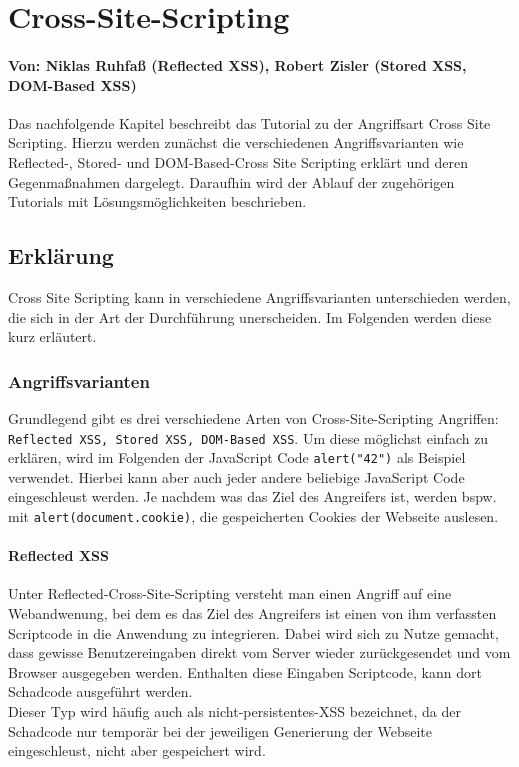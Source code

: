 \chapter{Cross-Site-Scripting}
\label{XSS}
\subsubsection*{Von: Niklas Ruhfaß (Reflected XSS), Robert Zisler (Stored XSS, DOM-Based XSS)}
Das nachfolgende Kapitel beschreibt das Tutorial zu der Angriffsart Cross Site Scripting. Hierzu werden zunächst die verschiedenen Angriffsvarianten wie Reflected-, Stored- und DOM-Based-Cross Site Scripting erklärt und deren Gegenmaßnahmen dargelegt. Daraufhin wird der Ablauf der zugehörigen Tutorials mit Lösungsmöglichkeiten beschrieben. 
\section{Erklärung}
Cross Site Scripting kann in verschiedene Angriffsvarianten unterschieden werden, die sich in der Art der Durchführung unerscheiden. Im Folgenden werden diese kurz erläutert. \\ 

\subsection{Angriffsvarianten}
Grundlegend gibt es drei verschiedene Arten von Cross-Site-Scripting Angriffen: \colorbox{altgray}{\lstinline|Reflected XSS, Stored XSS, DOM-Based XSS|}. Um diese möglichst einfach zu erklären, wird im Folgenden der JavaScript Code \colorbox{altgray}{\lstinline|alert("42")|} als Beispiel verwendet. Hierbei kann aber auch jeder andere beliebige JavaScript Code eingeschleust werden. Je nachdem was das Ziel des Angreifers ist, werden bspw. mit \colorbox{altgray}{\lstinline|alert(document.cookie)|}, die gespeicherten Cookies der Webseite auslesen. \\ 
\subsubsection*{Reflected XSS}
Unter Reflected-Cross-Site-Scripting versteht man einen Angriff auf eine Webandwenung, bei dem es
das Ziel des Angreifers ist einen von ihm verfassten Scriptcode in die Anwendung zu integrieren. Dabei wird sich zu Nutze gemacht, dass gewisse Benutzereingaben direkt vom Server wieder zurückgesendet und vom Browser ausgegeben werden. Enthalten diese Eingaben Scriptcode, kann dort Schadcode ausgeführt werden.\\
Dieser Typ wird häufig auch als nicht-persistentes-XSS bezeichnet, da der Schadcode nur temporär bei der jeweiligen Generierung der Webseite eingeschleust, nicht aber gespeichert wird.\\

